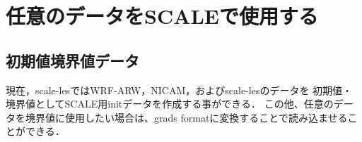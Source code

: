 \section{任意のデータをSCALEで使用する}





\subsection{初期値境界値データ}
\label{sec:adv_bnddata}

現在，scale-lesではWRF-ARW，NICAM，およびscale-lesのデータを
初期値・境界値としてSCALE用initデータを作成する事ができる．
この他、任意のデータを境界値に使用したい場合は、grads formatに変換することで読み込ませることができる．

